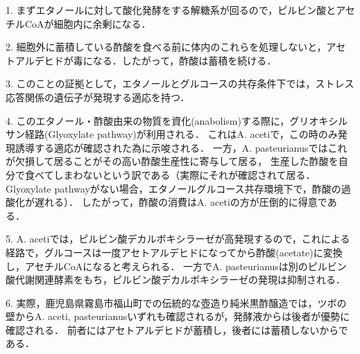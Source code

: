 \documentclass[uplatex, dvipdfmx]{jsarticle}
\begin{document}
\begin{screen}
1. まずエタノールに対して酸化発酵をする解糖系が回るので，ピルビン酸とアセチルCoAが細胞内に余剰になる．

2. 細胞外に蓄積している酢酸を食べる前に体内のこれらを処理しないと，アセトアルデヒドが毒になる．したがって，酢酸は蓄積を続ける．

3. このことの証拠として，エタノールとグルコースの共存条件下では，ストレス応答関係の遺伝子が発現する適応を持つ．

4. このエタノール・酢酸由来の物質を資化(anabolism)する際に，グリオキシルサン経路(Glyoxylate pathway)が利用される．
これはA. acetiで，この時のみ発現誘導する適応が確認された為に示唆される．
一方，A. pasteurianusではこれが欠損して居ることがその高い酢酸生産性に寄与して居る，
生産した酢酸を自分で食べてしまわないという訳である（実際にそれが確認されて居る．Glyoxylate pathwayがない場合，エタノールグルコース共存環境下で，酢酸の過酸化が遅れる）．
したがって，酢酸の消費はA. acetiの方が圧倒的に得意である．

5. A. acetiでは，ピルビン酸デカルボキシラーゼが高発現するので，これによる経路で，グルコースは一度アセトアルデヒドになってから酢酸(acetate)に変換し，アセチルCoAになると考えられる．
一方でA. pasteurianusは別のピルビン酸代謝関連酵素をもち，ピルビン酸デカルボキシラーゼの発現は抑制される．

6. 実際，鹿児島県霧島市福山町での伝統的な壺造り純米黒酢醸造では，ツボの壁からA. aceti, pasteurianusいずれも確認されるが，発酵液からは後者が優勢に確認される．
前者にはアセトアルデヒドが蓄積し，後者には蓄積しないからである．
\end{screen}
\end{document}
